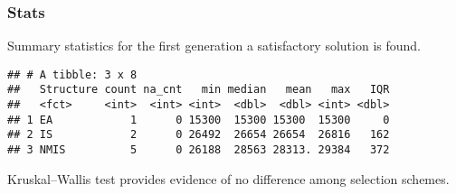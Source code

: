 \documentclass[]{book}
\newenvironment{Shaded}{\begin{snugshade}}{\end{snugshade}}
\newcommand{\CharTok}[1]{\textcolor[rgb]{0.31,0.60,0.02}{#1}}
\newcommand{\DataTypeTok}[1]{\textcolor[rgb]{0.13,0.29,0.53}{#1}}
\newcommand{\DecValTok}[1]{\textcolor[rgb]{0.00,0.00,0.81}{#1}}
\newcommand{\KeywordTok}[1]{\textcolor[rgb]{0.13,0.29,0.53}{\textbf{#1}}}
\newcommand{\NormalTok}[1]{#1}
\newcommand{\OperatorTok}[1]{\textcolor[rgb]{0.81,0.36,0.00}{\textbf{#1}}}
\newcommand{\OtherTok}[1]{\textcolor[rgb]{0.56,0.35,0.01}{#1}}
\newcommand{\StringTok}[1]{\textcolor[rgb]{0.31,0.60,0.02}{#1}}
\begin{document}
\hypertarget{stats-19}{%
\subsubsection{Stats}\label{stats-19}}

Summary statistics for the first generation a satisfactory solution is found.

\begin{Shaded}
\end{Shaded}

\begin{verbatim}
## # A tibble: 3 x 8
##   Structure count na_cnt   min median   mean   max   IQR
##   <fct>     <int>  <int> <int>  <dbl>  <dbl> <int> <dbl>
## 1 EA            1      0 15300  15300 15300  15300     0
## 2 IS            2      0 26492  26654 26654  26816   162
## 3 NMIS          5      0 26188  28563 28313. 29384   372
\end{verbatim}

Kruskal--Wallis test provides evidence of no difference among selection schemes.
\end{document}
